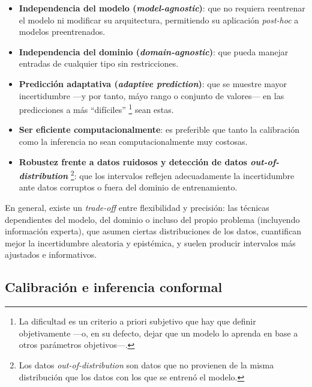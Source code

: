 \begin{itemize}
    \item \textbf{Independencia del modelo (\textit{model-agnostic})}: que no requiera reentrenar el modelo ni 
    modificar su arquitectura, permitiendo su aplicación \textit{post-hoc} a modelos preentrenados.

    \item \textbf{Independencia del dominio (\textit{domain-agnostic})}: que pueda manejar entradas de 
    cualquier tipo sin restricciones. 
     
    \item \textbf{Predicción adaptativa (\textit{adaptive prediction})}: que se muestre mayor incertidumbre 
    ---y por tanto, máyo rango o conjunto de valores--- en las predicciones a más ``difíciles''
    \footnote{
        La dificultad es un criterio a priori subjetivo que hay que definir objetivamente ---o, en su defecto,
        dejar que un modelo lo aprenda en base a otros parámetros objetivos---.
    } sean estas. 

    \item \textbf{Ser eficiente computacionalmente}: es preferible que tanto la calibración como la inferencia 
    no sean computacionalmente muy costosas. 
    
    \item \textbf{Robustez frente a datos ruidosos y detección de datos \textit{out-of-distribution}}
    \footnote{
        Los datos \textit{out-of-distribution} son datos que no provienen de la misma distribución que los 
        datos con los que se entrenó el modelo.
    }:
    que los intervalos reflejen adecuadamente la incertidumbre ante datos corruptos o fuera del dominio de 
    entrenamiento.  

\end{itemize}

En general, existe un \textit{trade-off} entre flexibilidad y precisión: las técnicas dependientes del modelo,
del dominio o incluso del propio problema (incluyendo información experta), que asumen ciertas distribuciones 
de los datos, cuantifican mejor la incertidumbre aleatoria y epistémica, y suelen producir intervalos más 
ajustados e informativos. 


\subsection{Calibración e inferencia conformal}

